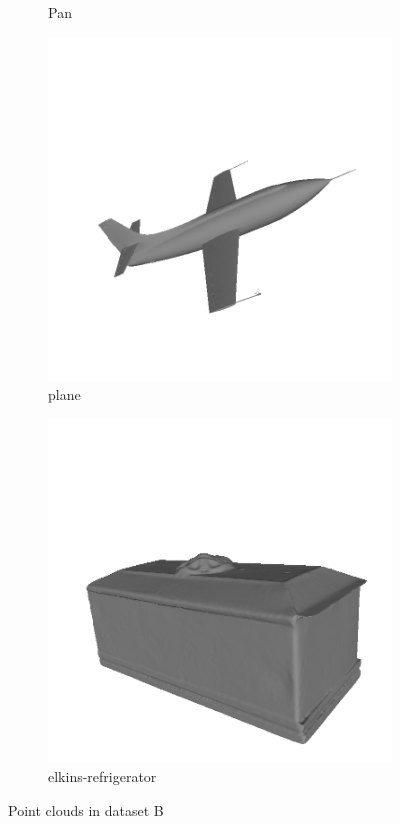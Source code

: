 \begin{figure}
\begin{subfigure}[b]{0.23\linewidth}
		\caption{Pan}
	\end{subfigure}
	\begin{subfigure}[b]{0.23\linewidth}
		\includegraphics[width=\linewidth]{./Figures/train-dataset/34.plane.png}
		\caption{plane}
	\end{subfigure}
	\begin{subfigure}[b]{0.23\linewidth}
		\includegraphics[width=\linewidth]{./Figures/train-dataset/35.elkins-refrigerator.png}
		\caption{elkins-refrigerator}
	\end{subfigure}
	

	
	
	\label{fig:dataset_b}
	\caption{Point clouds in dataset B }
\end{figure}



